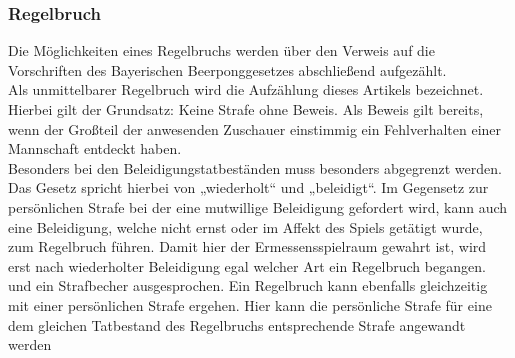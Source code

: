 \documentclass[a4paper, 12pt]{article}
\begin{document}
\subsubsection{Regelbruch}
Die Möglichkeiten eines Regelbruchs werden über den Verweis auf die Vorschriften des Bayerischen Beerponggesetzes abschließend aufgezählt.\\
Als unmittelbarer Regelbruch wird die Aufzählung dieses Artikels bezeichnet. Hierbei gilt der Grundsatz: Keine Strafe ohne Beweis. Als Beweis gilt bereits, wenn der Großteil der anwesenden Zuschauer einstimmig ein Fehlverhalten einer Mannschaft entdeckt haben.\\
Besonders bei den Beleidigungstatbeständen muss besonders abgegrenzt werden. Das Gesetz spricht hierbei von „wiederholt“ und „beleidigt“. Im Gegensetz zur persönlichen Strafe bei der eine mutwillige Beleidigung gefordert wird, kann auch eine Beleidigung, welche nicht ernst oder im Affekt des Spiels getätigt wurde, zum Regelbruch führen. Damit hier der Ermessensspielraum gewahrt ist, wird erst nach wiederholter Beleidigung egal welcher Art ein Regelbruch begangen.\\

und ein Strafbecher ausgesprochen. Ein Regelbruch kann ebenfalls gleichzeitig mit einer persönlichen Strafe ergehen. Hier kann die persönliche Strafe für eine dem gleichen Tatbestand des Regelbruchs entsprechende Strafe angewandt werden
\end{document}
